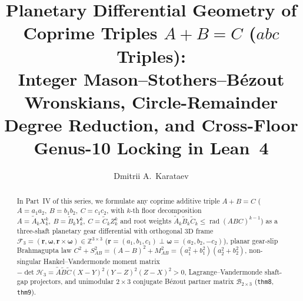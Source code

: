 \documentclass[11pt,a4paper]{article}
\title{\textbf{Planetary Differential Geometry of Coprime Triples $A + B = C$ ($abc$ Triples):\\ Integer Mason--Stothers--B\'ezout Wronskians, Circle-Remainder Degree Reduction, and Cross-Floor Genus-10 Locking in Lean~4}}
\author{Dmitrii A.~Karataev}
\date{}
\theoremstyle{plain}
\theoremstyle{definition}
\begin{document}
\maketitle

\begin{abstract}
In Part~IV of this series, we formulate any coprime additive triple $A + B = C$ ($A = a_1 a_2,\ B = b_1 b_2,\ C = c_1 c_2$, with $k$-th floor decomposition $A = \widetilde{A}_k X_k^k,\ B = \widetilde{B}_k Y_k^k,\ C = \widetilde{C}_k Z_k^k$ and root weights $\widetilde{A}_k\widetilde{B}_k\widetilde{C}_k \le \operatorname{rad}(ABC)^{k-1}$) as a three-shaft planetary gear differential with orthogonal $3\mathrm{D}$ frame $\mathcal{F}_3 = (\mathbf{r},\mathbf{\omega},\mathbf{r}\times\mathbf{\omega})\in\mathbb{Z}^{3\times 3}$ ($\mathbf{r} = (a_1,b_1,c_1)\perp\mathbf{\omega} = (a_2,b_2,-c_2)$), planar gear-slip Brahmagupta law $C^2 + S_{AB}^2 = (A-B)^2 + M_{AB}^2 = (a_1^2+b_1^2)(a_2^2+b_2^2)$, non-singular Hankel--Vandermonde moment matrix $-\det\mathcal{H}_3 = \widetilde{A}\widetilde{B}\widetilde{C}(X-Y)^2(Y-Z)^2(Z-X)^2 > 0$, Lagrange--Vandermonde shaft-gap projectors, and unimodular $2\times 3$ conjugate B\'ezout partner matrix $\mathcal{B}_{2\times 3}$ (\texttt{thm8}, \texttt{thm9}).


\end{abstract}
\end{document}
